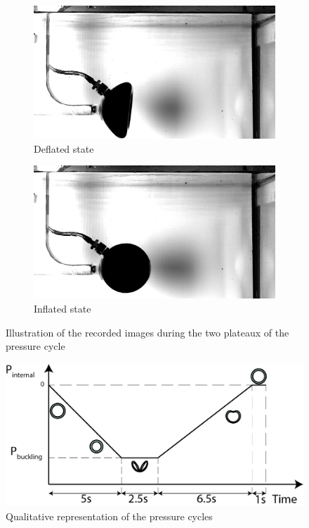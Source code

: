 \begin{figure}[H]%
	\centering%
	 \begin{subfigure}[h]{0.48\textwidth}%
        \includegraphics[width=\linewidth]{figures/Chapter_1/cycles_lp_00241.png}%
        \caption{Deflated state}%
    \end{subfigure}%
    \begin{subfigure}[h]{0.48\textwidth}%
        \includegraphics[width=\linewidth]{figures/Chapter_1/cycles_lp_00001.png}%
        \caption{Inflated state}%
    \end{subfigure}%
		\caption{Illustration of the recorded images during the two plateaux of the pressure cycle}
		\label{fig:illustration_frictionless_rail}
\end{figure}
 \begin{figure}[H]%
	\centering%
	\includegraphics[width=\textwidth]{figures/Chapter_1/pressure_cycle_fr.png}
	\caption{Qualitative representation of the pressure cycles}
	\label{fig:pressure_cycle_fr}
\end{figure}

